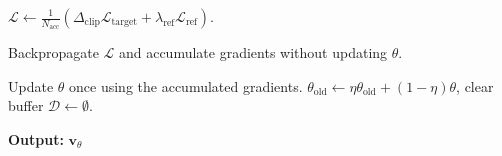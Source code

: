\documentclass{article} %
\begin{document}
\begin{algorithm}[H]
\begin{algorithmic}[1]
                \State $\mathcal{L} \leftarrow
                \frac{1}{N_{\mathrm{acc}}}\left(
                    \Delta_{\mathrm{clip}}\mathcal{L}_{\mathrm{target}}
                    +
                    \lambda_{\mathrm{ref}}\mathcal{L}_{\mathrm{ref}}
                \right)$.

                \State Backpropagate $\mathcal{L}$ and accumulate gradients without updating $\theta$.
            \EndFor

            \State Update $\theta$ once using the accumulated gradients.
            \State $\theta_{\mathrm{old}} \leftarrow \eta\theta_{\mathrm{old}} + (1-\eta)\theta$, clear buffer $\mathcal{D} \leftarrow \emptyset$. 
        \EndFor
    \end{algorithmic}
    \textbf{Output:} $\mathbf{v}_\theta$
\end{algorithm}


\newpage            
\end{document}
